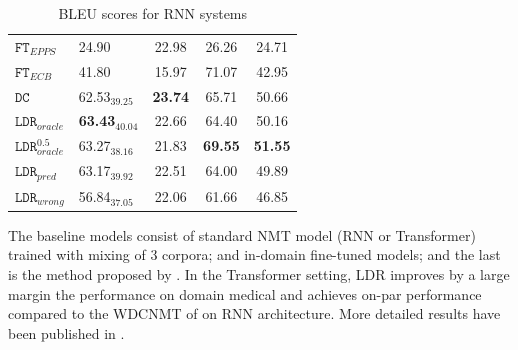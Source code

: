 \documentclass[12pt,a4paper,twoside]{report}
\theoremstyle{definition}
\begin{document}
\begin{table}[h!]
{\begin{center}
{\begin{tabular}{|l|lcc|c|}
$\mathtt{FT}_{EPPS}$   & 24.90$ $ & 22.98 & 26.26 & 24.71\\
$\mathtt{FT}_{ECB}$     & 41.80$ $ & 15.97 & 71.07 & 42.95\\
\hline
$\mathtt{DC}$                & 62.53$_{39.25}$ & \bf 23.74 & 65.71 & 50.66\\
\hline
$\mathtt{LDR}_{oracle}$     & \bf 63.43$_{40.04}$ & 22.66 & 64.40 & 50.16\\
$\mathtt{LDR}_{oracle}^{0.5}$   & 63.27$_{38.16}$ & 21.83 & \bf 69.55 & \bf 51.55\\
$\mathtt{LDR}_{pred}$        & 63.17$_{39.92}$ & 22.51 & 64.00 & 49.89\\
$\mathtt{LDR}_{wrong}$     & 56.84$_{37.05}$ & 22.06 & 61.66 & 46.85\\
\hline
\end{tabular}
} %
\end{center}
\caption{BLEU scores for RNN systems\label{tab:results-rnn}}
}
\end{table}
\begin{table}[!h]
\begin{center}
\end{center}
\caption{BLEU scores for RNN systems. Comparison between \texttt{WDCMT} and $\texttt{LDR}_{pred}$ built using conditional GRUs.\label{tab:results-rnn-wdcmt}}
\end{table}

The baseline models consist of standard NMT model (RNN or Transformer) trained with mixing of 3 corpora; and in-domain fine-tuned models; and the last is the method proposed by \cite{Zheng18multi}. In the Transformer setting, LDR improves by a large margin the performance on domain medical and achieves on-par performance compared to the WDCNMT of \cite{Zheng18multi} on RNN architecture. More detailed results have been published in \cite{Pham19generic}.
\end{document}
